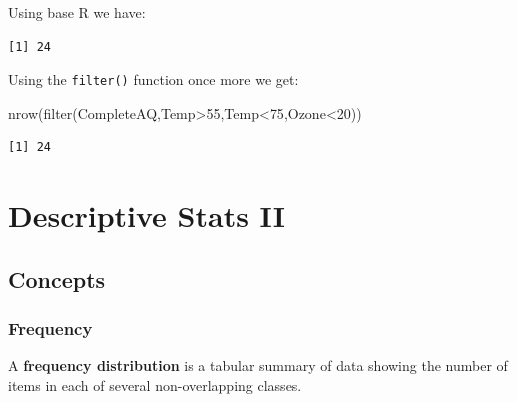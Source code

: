 \documentclass[
  letterpaper,
  DIV=11,
  numbers=noendperiod]{scrreprt}
\newenvironment{Shaded}{\begin{snugshade}}{\end{snugshade}}
\newcommand{\DecValTok}[1]{\textcolor[rgb]{0.68,0.00,0.00}{#1}}
\newcommand{\FunctionTok}[1]{\textcolor[rgb]{0.28,0.35,0.67}{#1}}
\newcommand{\NormalTok}[1]{\textcolor[rgb]{0.00,0.23,0.31}{#1}}
\newcommand{\SpecialCharTok}[1]{\textcolor[rgb]{0.37,0.37,0.37}{#1}}
\begin{document}
Using base R we have:

\begin{Shaded}
\end{Shaded}

\begin{verbatim}
[1] 24
\end{verbatim}

Using the \texttt{filter()} function once more we get:

\begin{Shaded}
\begin{Highlighting}[numbers=left,,]
\FunctionTok{nrow}\NormalTok{(}\FunctionTok{filter}\NormalTok{(CompleteAQ,Temp}\SpecialCharTok{\textgreater{}}\DecValTok{55}\NormalTok{,Temp}\SpecialCharTok{\textless{}}\DecValTok{75}\NormalTok{,Ozone}\SpecialCharTok{\textless{}}\DecValTok{20}\NormalTok{))}
\end{Highlighting}
\end{Shaded}

\begin{verbatim}
[1] 24
\end{verbatim}

\hypertarget{descriptive-stats-ii}{%
\chapter{Descriptive Stats II}\label{descriptive-stats-ii}}

\hypertarget{concepts-1}{%
\section{Concepts}\label{concepts-1}}

\hypertarget{frequency}{%
\subsection*{Frequency}\label{frequency}}

A \textbf{frequency distribution} is a tabular summary of data showing
the number of items in each of several non-overlapping classes.
\end{document}
